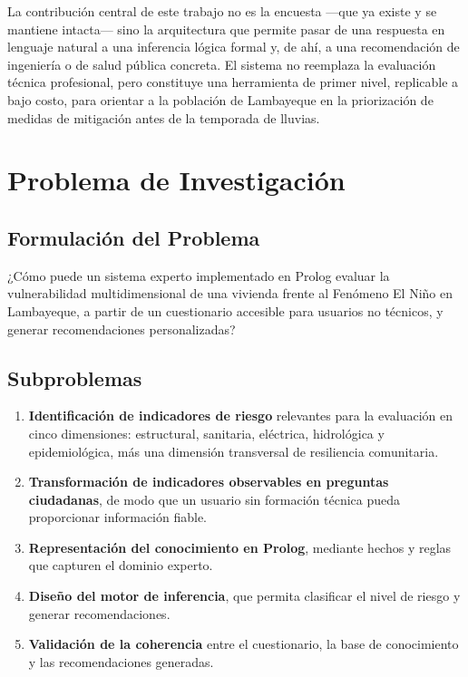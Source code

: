 \documentclass[12pt, letterpaper]{article}
\begin{document}
La contribución central de este trabajo no es la encuesta —que ya existe y se mantiene intacta— sino la arquitectura que permite pasar de una respuesta en lenguaje natural a una inferencia lógica formal y, de ahí, a una recomendación de ingeniería o de salud pública concreta. El sistema no reemplaza la evaluación técnica profesional, pero constituye una herramienta de primer nivel, replicable a bajo costo, para orientar a la población de Lambayeque en la priorización de medidas de mitigación antes de la temporada de lluvias.

\section{Problema de Investigación}

\subsection{Formulación del Problema}

¿Cómo puede un sistema experto implementado en Prolog evaluar la vulnerabilidad multidimensional de una vivienda frente al Fenómeno El Niño en Lambayeque, a partir de un cuestionario accesible para usuarios no técnicos, y generar recomendaciones personalizadas?

\subsection{Subproblemas}

\begin{enumerate}
  \item \textbf{Identificación de indicadores de riesgo} relevantes para la evaluación en cinco dimensiones: estructural, sanitaria, eléctrica, hidrológica y epidemiológica, más una dimensión transversal de resiliencia comunitaria.
  \item \textbf{Transformación de indicadores observables en preguntas ciudadanas}, de modo que un usuario sin formación técnica pueda proporcionar información fiable.
  \item \textbf{Representación del conocimiento en Prolog}, mediante hechos y reglas que capturen el dominio experto.
  \item \textbf{Diseño del motor de inferencia}, que permita clasificar el nivel de riesgo y generar recomendaciones.
  \item \textbf{Validación de la coherencia} entre el cuestionario, la base de conocimiento y las recomendaciones generadas.
\end{enumerate}
\end{document}
